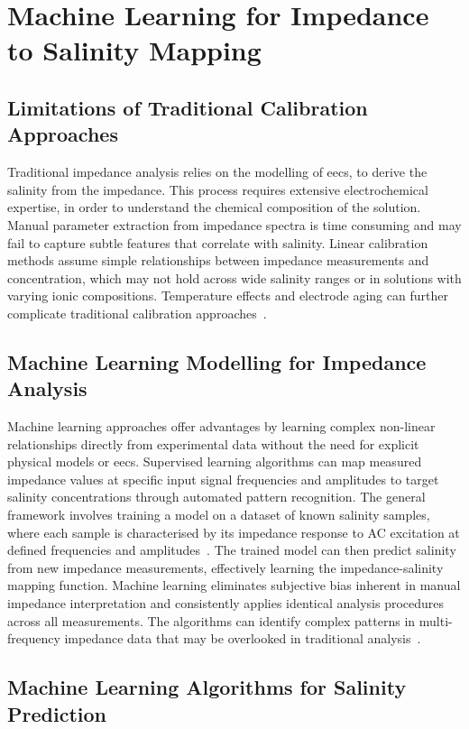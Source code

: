 \section{Machine Learning for Impedance to Salinity Mapping}
\subsection{Limitations of Traditional Calibration Approaches}
Traditional impedance analysis relies on the modelling of \glspl{eec}, to derive the salinity from the impedance.
This process requires extensive electrochemical expertise, in order to understand the chemical composition of the solution.
Manual parameter extraction from impedance spectra is time consuming and may fail to capture subtle features that correlate with salinity.
Linear calibration methods assume simple relationships between impedance measurements and concentration, which may not hold across wide salinity ranges or in solutions with varying ionic compositions.
Temperature effects and electrode aging can further complicate traditional calibration approaches~\cite{barsoukov_impedance_2005}.

\subsection{Machine Learning Modelling for Impedance Analysis}
Machine learning approaches offer advantages by learning complex non-linear relationships directly from experimental data without the need for explicit physical models or \glspl{eec}.
Supervised learning algorithms can map measured impedance values at specific input signal frequencies and amplitudes to target salinity concentrations through automated pattern recognition.
The general framework involves training a model on a dataset of known salinity samples, where each sample is characterised by its impedance response to AC excitation at defined frequencies and amplitudes~\cite{bongiorno_exploring_2022}. 
The trained model can then predict salinity from new impedance measurements, effectively learning the impedance-salinity mapping function.
Machine learning eliminates subjective bias inherent in manual impedance interpretation and consistently applies identical analysis procedures across all measurements.
The algorithms can identify complex patterns in multi-frequency impedance data that may be overlooked in traditional analysis~\cite{xu_electrochemical_2020}.

\subsection{Machine Learning Algorithms for Salinity Prediction}
